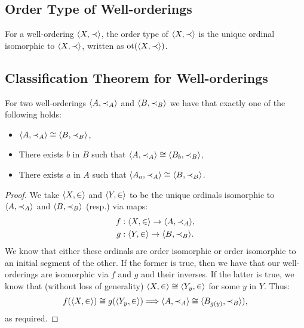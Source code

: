 \subsection{Order Type of Well-orderings}

For a well-ordering $\langle X, \prec \rangle$, the order type of $\langle X, \prec \rangle$
is the unique ordinal isomorphic to $\langle X, \prec \rangle$, written as
$\operatorname{ot}(\langle X, \prec \rangle)$.

\subsection{Classification Theorem for Well-orderings}

For two well-orderings $\langle A, \prec_A \rangle$ and $\langle B, \prec_B \rangle$
we have that exactly one of the following holds: \begin{itemize}
    \item $\langle A, \prec_A \rangle \cong \langle B, \prec_B \rangle$,
    \item There exists $b$ in $B$ such that 
        $\langle A, \prec_A \rangle \cong \langle B_b, \prec_B \rangle$,
    \item There exists $a$ in $A$ such that 
        $\langle A_a, \prec_A \rangle \cong \langle B, \prec_B \rangle$.
\end{itemize}

\begin{proof}
    We take $\langle X, \in \rangle$ and $\langle Y, \in \rangle$ to be the unique ordinals
    isomorphic to $\langle A, \prec_A \rangle$ and $\langle B, \prec_B \rangle$ (resp.)
    via maps: \begin{align*}
        f &: \langle X, \in \rangle \to \langle A, \prec_A \rangle, \\
        g &: \langle Y, \in \rangle \to \langle B, \prec_B \rangle. \\
    \end{align*} We know that either these ordinals are order isomorphic
    or order isomorphic to an initial segment of the other. If the
    former is true, then we have that our well-orderings are isomorphic
    via $f$ and $g$ and their inverses. If the latter is true,
    we know that (without loss of generality) 
    $\langle X, \in \rangle \cong \langle Y_y, \in \rangle$ for some $y$ in $Y$.
    Thus: \begin{align*}
        f(\langle X, \in \rangle) \cong g(\langle Y_y, \in \rangle)
        \Longrightarrow
        \langle A, \prec_A \rangle \cong \langle B_{g(y)}, \prec_B \rangle),
    \end{align*} as required.
\end{proof}
